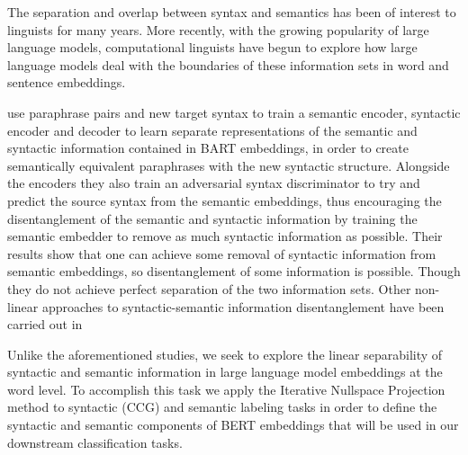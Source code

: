 \documentclass[11pt,a4paper]{article}
\begin{document}

The separation and overlap between syntax and semantics has been of interest to linguists for many years. More recently, with the growing popularity of large language models, computational linguists have begun to explore how large language models deal with the boundaries of these information sets in word and sentence embeddings. 

\citealp{disentangle} use paraphrase pairs and new target syntax to train a semantic encoder, syntactic encoder and decoder to learn separate representations of the semantic and syntactic information contained in BART embeddings, in order to create semantically equivalent paraphrases with the new syntactic structure. Alongside the encoders they also train an adversarial syntax discriminator to try and predict the source syntax from the semantic embeddings, thus encouraging the disentanglement of the semantic and syntactic information by training the semantic embedder to remove as much syntactic information as possible. Their results show that one can achieve some removal of syntactic information from semantic embeddings, so disentanglement of some information is possible. Though they do not achieve perfect separation of the two information sets. Other non-linear approaches to syntactic-semantic information disentanglement have been carried out in \citealp{multiDis}


Unlike the aforementioned studies, we seek to explore the linear separability of syntactic and semantic information in large language model embeddings at the word level. To accomplish this task we apply the Iterative Nullspace Projection method to syntactic (CCG) and semantic labeling tasks in order to define the syntactic and semantic components of BERT embeddings that will be used in our downstream classification tasks. 
\end{document}
